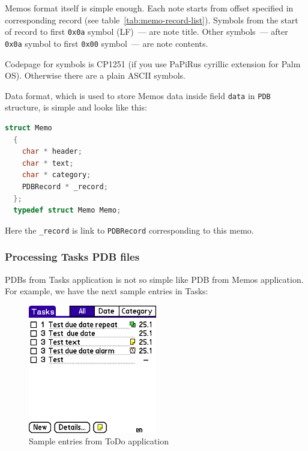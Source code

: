 \documentclass[a4paper,12pt,oneside]{scrartcl}
\begin{document}
Memos format itself is simple enough. Each note starts from offset specified in
corresponding record (see table~\ref{tab:memo-record-list}). Symbols from the
start of record to first \texttt{0x0a} symbol (LF)~--- are note title. Other
symbols~--- after \texttt{0x0a} symbol to first \texttt{0x00} symbol~--- are
note contents.

Codepage for symbols is CP1251 (if you use PaPiRus cyrillic extension for Palm
OS). Otherwise there are a plain ASCII symbols.

Data format, which is used to store Memos data inside field \texttt{data} in
\texttt{PDB} structure, is simple and looks like this:
\begin{lstlisting}[language=C, caption={C structure to store memo data}]
  struct Memo
  {
	char * header;
	char * text;
    char * category;
    PDBRecord * _record;
  };
  typedef struct Memo Memo;
\end{lstlisting}

Here the \texttt{_record} is link to \texttt{PDBRecord} corresponding to this
memo.

\subsubsection{Processing Tasks PDB files}
\label{sec:processing-todo-pdb}

PDBs from Tasks application is not so simple like PDB from Memos
application. For example, we have the next sample entries in Tasks:

\begin{figure}[H]
  \centering
  \includegraphics[width=0.5\textwidth]{tasks.png}
  \caption{Sample entries from ToDo application}
  \label{fig:sample-todos}
\end{figure}
\end{document}
